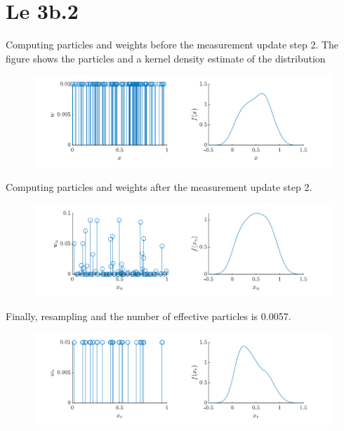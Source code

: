 \section{Le 3b.2}
Computing particles and weights before the measurement update step 2. The figure shows the particles and a kernel density estimate of the distribution
\begin{figure}[!h]
    \centering
    \includegraphics{figures/ex4_b2a.pdf}
\end{figure}

Computing particles and weights after the measurement update step 2. 
\begin{figure}[!h]
    \centering
    \includegraphics{figures/ex4_b2b.pdf}
\end{figure}

Finally, resampling and the number of effective particles is 0.0057.
\begin{figure}[!h]
    \centering
    \includegraphics{figures/ex4_b2c.pdf}
\end{figure}